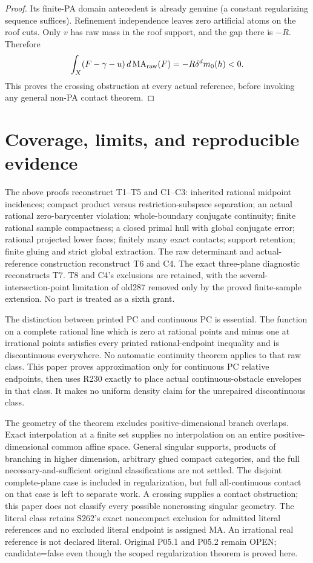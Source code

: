 \documentclass[11pt]{article}
\newcommand{\MA}{\operatorname{MA}_{\rm raw}}
\begin{document}
\begin{proof}
Its finite-PA domain antecedent is already genuine (a constant regularizing sequence suffices). Refinement independence leaves zero artificial atoms on the roof cuts. Only $v$ has raw mass in the roof support, and the gap there is $-R$. Therefore
\[
 \int_X(F-\gamma-u)\,d\MA(F)=-R\delta^d m_0(h)<0.
\]
This proves the crossing obstruction at every actual reference, before invoking any general non-PA contact theorem.
\end{proof}

\section{Coverage, limits, and reproducible evidence}
The above proofs reconstruct T1--T5 and C1--C3: inherited rational midpoint incidences; compact product versus restriction-subspace separation; an actual rational zero-barycenter violation; whole-boundary conjugate continuity; finite rational sample compactness; a closed primal hull with global conjugate error; rational projected lower faces; finitely many exact contacts; support retention; finite gluing and strict global extraction. The raw determinant and actual-reference construction reconstruct T6 and C4. The exact three-plane diagnostic reconstructs T7. T8 and C4's exclusions are retained, with the several-intersection-point limitation of old287 removed only by the proved finite-sample extension. No part is treated as a sixth grant.

The distinction between printed PC and continuous PC is essential. The function on a complete rational line which is zero at rational points and minus one at irrational points satisfies every printed rational-endpoint inequality and is discontinuous everywhere. No automatic continuity theorem applies to that raw class. This paper proves approximation only for continuous PC relative endpoints, then uses R230 exactly to place actual continuous-obstacle envelopes in that class. It makes no uniform density claim for the unrepaired discontinuous class.

The geometry of the theorem excludes positive-dimensional branch overlaps. Exact interpolation at a finite set supplies no interpolation on an entire positive-dimensional common affine space. General singular supports, products of branching in higher dimension, arbitrary glued compact categories, and the full necessary-and-sufficient original classifications are not settled. The disjoint complete-plane case is included in regularization, but full all-continuous contact on that case is left to separate work. A crossing supplies a contact obstruction; this paper does not classify every possible noncrossing singular geometry. The literal class retains S262's exact noncompact exclusion for admitted literal references and no excluded literal endpoint is assigned MA. An irrational real reference is not declared literal. Original P05.1 and P05.2 remain OPEN; candidate=false even though the scoped regularization theorem is proved here.
\end{document}
